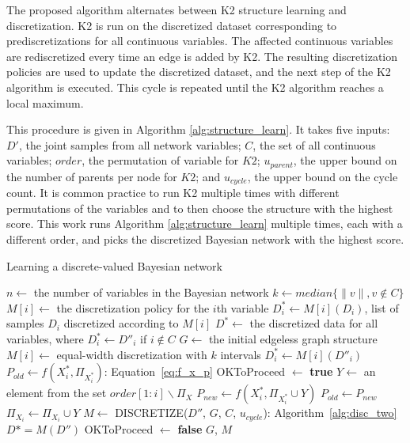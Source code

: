 The proposed algorithm alternates between K2 structure learning and discretization.
K2 is run on the discretized dataset corresponding to prediscretizations for all continuous variables.
The affected continuous variables are rediscretized every time an edge is added by K2.
The resulting discretization policies are used to update the discretized dataset, and the next step of the K2 algorithm is executed.
This cycle is repeated until the K2 algorithm reaches a local maximum.

This procedure is given in Algorithm \ref{alg:structure_learn}.
It takes five inputs: $D'$, the joint samples from all network variables; $C$, the set of all continuous variables; $order$, the permutation of variable for $K2$; $u_{parent}$, the upper bound on the number of parents per node for $K2$; and $u_{cycle}$, the upper bound on the cycle count.
It is common practice to run K2 multiple times with different permutations of the variables and to then choose the structure with the highest score.
This work runs Algorithm \ref{alg:structure_learn} multiple times, each with a different order, and picks the discretized Bayesian network with the highest score.

\begin{algorithm}
  \caption{ Learning a discrete-valued Bayesian network}
  \label{alg:structure_learn}
  \begin{algorithmic}[5]
    \State $n \leftarrow$ the number of variables in the Bayesian network
    \State $k \leftarrow median\{ \|v\|, v\notin C\}$
    \State $M[i] \leftarrow$ the discretization policy for the $i$th variable
    \State $D^*_i \leftarrow M[i] (D_i)$, list of samples $D_i$ discretized according to $M[i]$
    \State $D^* \leftarrow $ the discretized data for all variables, where $D^*_i \leftarrow D''_i$ if $i \notin C$
    \State $G \leftarrow$ the initial edgeless graph structure
        \State $M[i] \leftarrow$  equal-width discretization with $k$ intervals
        \State $D^*_i \leftarrow  M[i] (D''_i)$
      \EndIf
    \EndFor
      \State $P_{old} \leftarrow f(X^*_i,\Pi_{X^*_i})$: Equation~\ref{eq:f_x_p}
      \State OKToProceed $\leftarrow$ \textbf{true}
        \State $Y \leftarrow$ an element from the set $order[1:i] \backslash \Pi_X$
        \State $P_{new} \leftarrow f(X^*_i,\Pi_{X^*_i} \cup Y)$
          \State $P_{old} \leftarrow P_{new}$
          \State $\Pi_{X_i} \leftarrow \Pi_{X_i} \cup Y $
          \State $M \leftarrow$ {DISCRETIZE}({$D''$, $G$, $C$, $u_{cycle}$}): Algorithm~\ref{alg:disc_two}
          \State $D* = M(D'')$
        \Else
          \State OKToProceed $\leftarrow$ \textbf{false}
        \EndIf
      \EndWhile
    \EndFor
    \State \Return $G$, $M$
  \EndFunction
  \end{algorithmic}
\end{algorithm}

